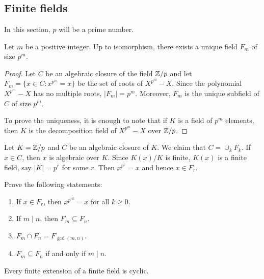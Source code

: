 \section{}

\subsection{Finite fields}

In this section, $p$ will be a prime number. 

\begin{proposition}
    Let $m$ be a positive integer. 
    Up to isomorphism, there exists a unique 
    field $F_m$ of size $p^m$. 
\end{proposition}

\begin{proof}
    Let $C$ be an algebraic closure of the field $\mathbb{Z}/p$ and 
    let $F_m=\{x\in C:x^{p^m}=x\}$ be the set of roots of $X^{p^m}-X$. Since 
    the polynomial $X^{p^m}-X$ has no multiple roots, $|F_m|=p^m$. Moreover, 
    $F_m$ is the unique subfield of $C$ of size $p^m$. 
    
    To prove the uniqueness, it is enough to note that 
    if $K$ is a field of $p^m$ elements, then
    $K$ is the decomposition field of $X^{p^m}-X$ over $\mathbb{Z}/p$.  
\end{proof}

Let $K=\mathbb{Z}/p$ and $C$ be an algebraic closure of $K$. 
We claim that $C=\cup_k F_k$. If $x\in C$, then $x$ is algebraic over $K$. 
Since $K(x)/K$ is finite, $K(x)$ is a finite field, say 
$|K|=p^r$ for some $r$. Then $x^{p^r}=x$ and hence $x\in F_r$. 

\begin{exercise}
    Prove the following statements:
    \begin{enumerate}
        \item If $x\in F_r$, then $x^{p^{rk}}=x$ for all $k\geq0$.
        \item If $m\mid n$, then $F_m\subseteq F_n$. 
        \item $F_m\cap F_n=F_{\gcd(m,n)}$.
        \item $F_m\subseteq F_n$ if and only if $m\mid n$. 
    \end{enumerate}
\end{exercise}

\begin{proposition}
    Every finite extension of a finite field is cyclic. 
\end{proposition}

